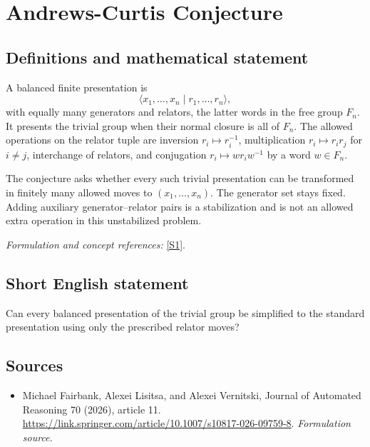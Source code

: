 \documentclass[11pt]{article}
\begin{document}
\section*{\texorpdfstring{Andrews-Curtis Conjecture}{Andrews-Curtis Conjecture}}\label{statement}
\subsection{Definitions and mathematical statement}
A balanced finite presentation is
\[
 \langle x_1,\ldots,x_n\mid r_1,\ldots,r_n\rangle,
\]
with equally many generators and relators, the latter words in the free group $F_n$. It presents the trivial group when their normal closure is all of $F_n$. The allowed operations on the relator tuple are inversion $r_i\mapsto r_i^{-1}$, multiplication $r_i\mapsto r_ir_j$ for $i\ne j$, interchange of relators, and conjugation $r_i\mapsto w r_iw^{-1}$ by a word $w\in F_n$.

The conjecture asks whether every such trivial presentation can be transformed in finitely many allowed moves to $(x_1,\ldots,x_n)$. The generator set stays fixed. Adding auxiliary generator--relator pairs is a stabilization and is not an allowed extra operation in this unstabilized problem.
\par\smallskip\textit{Formulation and concept references:} \href{https://link.springer.com/article/10.1007/s10817-026-09759-8}{[S1]}.

\subsection{Short English statement}
Can every balanced presentation of the trivial group be simplified to the standard presentation using only the prescribed relator moves?
\subsection{Sources}
\begin{itemize}
\item[S1]Michael Fairbank, Alexei Lisitsa, and Alexei Vernitski, Journal of Automated Reasoning 70 (2026), article 11.
\url{https://link.springer.com/article/10.1007/s10817-026-09759-8}.
\textit{Formulation source.}
\end{itemize}
\end{document}
